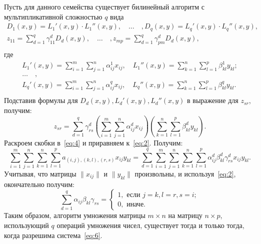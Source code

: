 \documentclass[12pt]{article}
\begin{document}
    Пусть для данного семейства существует билинейный алгоритм с мультипликативной сложностью $ q $ вида
    \begin{gather*}
        D_1(x, y) = L_1'(x, y) \cdot L_1''(x, y), \quad \dots \quad , D_q(x, y) = L_q'(x, y) \cdot L_q''(x, y),\\
        z_{11} = \sum_{d=1}^{q}\gamma_{11}^d D_d(x, y), \quad \dots \quad , z_{mp} = \sum_{d=1}^{q}\gamma_{pm}^d D_d(x, y),\\
    \end{gather*}
    где
    \begin{gather*}
        L_1'(x, y) = \sum_{i=1}^{m} \sum_{j=1}^{n} \alpha_{ij}^1 x_{ij}, \quad L_1''(x, y) = \sum_{k=1}^{n} \sum_{l=1}^{p} \beta_{kl}^1 y_{kl};\\
        \dots \quad ,\\
        L_q'(x, y) = \sum_{i=1}^{m} \sum_{j=1}^{n} \alpha_{ij}^q x_{ij}, \quad L_q''(x, y) = \sum_{k=1}^{n} \sum_{l=1}^{p} \beta_{kl}^q y_{kl}.\\
    \end{gather*}
    Подставив формулы для $ D_d(x, y), L_d'(x, y), L_d''(x, y) $ в выражение для $ z_{sr} $, получим:
    \begin{equation}
        z_{sr} = \sum_{d=1}^{q} \gamma_{rs}^d (\sum_{i=1}^{m} \sum_{j=1}^{n} \alpha_{ij}^d x_{ij}) (\sum_{k=1}^{n} \sum_{l=1}^{p} \beta_{kl}^d y_{kl}).\label{eq:4}
    \end{equation}
    Раскроем скобки в~\eqref{eq:4} и приравняем к~\eqref{eq:2}.
    Получим:
    \begin{equation}
        \sum_{i=1}^{m} \sum_{j=1}^{n} \sum_{k=1}^{n} \sum_{l=1}^{p} a_{(i,j),(k,l),(r,s)} x_{ij} y_{kl} =
        \sum_{d=1}^{q} \sum_{i=1}^{m} \sum_{j=1}^{n} \sum_{k=1}^{n} \sum_{l=1}^{p} \alpha_{ij}^d \beta_{kl}^d \gamma_{rs}^d x_{ij} y_{kl}.\label{eq:5}
    \end{equation}
    Учитывая, что матрицы $ \| x_{ij} \| $ и $ \| y_{kl} \| $ произвольны, и используя~\eqref{eq:2}, окончательно получим:
    \begin{equation}
        \sum_{d=1}^{q} \alpha_{ij} \beta_{kl} \gamma_{rs} =
        \begin{cases}
            1,\text{ если } j = k, l = r, s = i;\\
            0, \text{ иначе.}
        \end{cases}\label{eq:6}
    \end{equation}
    Таким образом, алгоритм умножения матрицы $ m \times n $ на матрицу $ n \times p $, использующий $ q $ операций
    умножения чисел, существует тогда и только тогда, когда разрешима система~\eqref{eq:6}.
\end{document}
